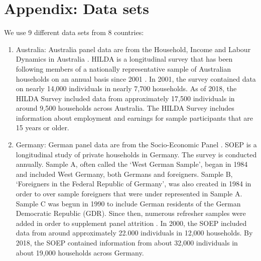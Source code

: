 \clearpage
\appendix


\section{Appendix: Data sets}\label{sec:data}
\setcounter{figure}{0}    
\setcounter{table}{0}    
\renewcommand*\thetable{\Alph{section}.\arabic{table}}
\renewcommand*\thefigure{\Alph{section}.\arabic{figure}}
\renewcommand{\theHfigure}{\Alph{section}.\arabic{table}}
\renewcommand{\theHtable}{\Alph{section}.\arabic{figure}}

We use 9 different data sets from 8 countries:

\begin{enumerate}
    \item Australia: Australia panel data are from the Household, Income and Labour Dynamics in Australia \citep{hilda_household_2022}.  HILDA is a longitudinal survey that has been following members of a nationally representative sample of Australian households on an annual basis since 2001 \citep{watson_wooden_2012}.  In 2001, the survey contained data on nearly 14,000 individuals in nearly 7,700 households.  As of 2018, the HILDA Survey included data from approximately 17,500 individuals in around 9,500 households across Australia.  The HILDA Survey includes information about employment and earnings for sample participants that are 15 years or older.  

    \item Germany: German panel data are from the Socio-Economic Panel \citep{soep_2020}.  SOEP is a longitudinal study of private households in Germany.  The survey is conducted annually.  Sample A, often called the `West German Sample', began in 1984 and included West Germany, both Germans and foreigners.  Sample B, `Foreigners in the Federal Republic of Germany', was also created in 1984 in order to over sample foreigners that were under represented in Sample A.  Sample C was begun in 1990 to include German residents of the German Democratic Republic (GDR).  Since then, numerous refresher samples were added in order to supplement panel attrition \citep{soep_jan_2019}.  In 2000, the SOEP included data from around approximately 22.000 individuals in 12,000 households. By 2018, the SOEP contained information from about 32,000 individuals in about 19,000 households across Germany.


\end{enumerate}

